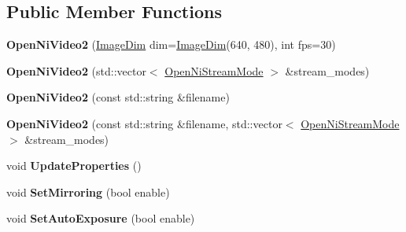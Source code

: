 \subsection*{Public Member Functions}
\begin{DoxyCompactItemize}
\item 
{\bfseries Open\+Ni\+Video2} (\hyperlink{structpangolin_1_1_image_dim}{Image\+Dim} dim=\hyperlink{structpangolin_1_1_image_dim}{Image\+Dim}(640, 480), int fps=30)\hypertarget{structpangolin_1_1_open_ni_video2_a3d7abca592256f39342a1e3c53d43683}{}\label{structpangolin_1_1_open_ni_video2_a3d7abca592256f39342a1e3c53d43683}

\item 
{\bfseries Open\+Ni\+Video2} (std\+::vector$<$ \hyperlink{structpangolin_1_1_open_ni_stream_mode}{Open\+Ni\+Stream\+Mode} $>$ \&stream\+\_\+modes)\hypertarget{structpangolin_1_1_open_ni_video2_a7bc1485077cb7829502a4af5cdd086d0}{}\label{structpangolin_1_1_open_ni_video2_a7bc1485077cb7829502a4af5cdd086d0}

\item 
{\bfseries Open\+Ni\+Video2} (const std\+::string \&filename)\hypertarget{structpangolin_1_1_open_ni_video2_a82f65ee9cad3e7954e40319872110e57}{}\label{structpangolin_1_1_open_ni_video2_a82f65ee9cad3e7954e40319872110e57}

\item 
{\bfseries Open\+Ni\+Video2} (const std\+::string \&filename, std\+::vector$<$ \hyperlink{structpangolin_1_1_open_ni_stream_mode}{Open\+Ni\+Stream\+Mode} $>$ \&stream\+\_\+modes)\hypertarget{structpangolin_1_1_open_ni_video2_a4d6a941bd0e3f380f9071ae2e5fdd32d}{}\label{structpangolin_1_1_open_ni_video2_a4d6a941bd0e3f380f9071ae2e5fdd32d}

\item 
void {\bfseries Update\+Properties} ()\hypertarget{structpangolin_1_1_open_ni_video2_a9ba2c0fa25ae7fef7556c4e27de11275}{}\label{structpangolin_1_1_open_ni_video2_a9ba2c0fa25ae7fef7556c4e27de11275}

\item 
void {\bfseries Set\+Mirroring} (bool enable)\hypertarget{structpangolin_1_1_open_ni_video2_a7804a6a59a5b1357eaa4ceb08d419fdb}{}\label{structpangolin_1_1_open_ni_video2_a7804a6a59a5b1357eaa4ceb08d419fdb}

\item 
void {\bfseries Set\+Auto\+Exposure} (bool enable)\hypertarget{structpangolin_1_1_open_ni_video2_a604c1bb67b1e9038bac2a8a3f6ed6f14}{}\label{structpangolin_1_1_open_ni_video2_a604c1bb67b1e9038bac2a8a3f6ed6f14}


\end{DoxyCompactItemize}
